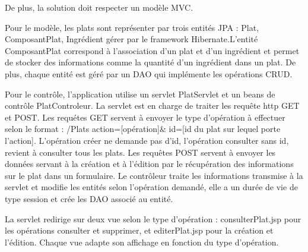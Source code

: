 De plus, la solution doit respecter un modèle MVC.

Pour le modèle, les plats sont représenter par trois entités JPA : Plat, ComposantPlat, Ingrédient gérer par le framework Hibernate.L'entité ComposantPlat correspond à l'association d'un plat et d'un ingrédient et permet de stocker des informations comme la quantité d'un ingrédient dans un plat. De plus, chaque entité est géré par un DAO qui implémente les opérations CRUD.

Pour le contrôle, l'application utilise un servlet PlatServlet et un beans de contrôle PlatControleur.
La servlet est en charge de traiter les requête http GET et POST. Les requétes GET servent à envoyer le type d'opération à effectuer selon le format : /Plats\? action=[opération]\& id=[id du plat sur lequel porte l'action]. L'opération créer ne demande pas d'id, l'opération consulter sans id, revient à consulter tous les plats.
Les requêtes POST servent à envoyer les données servant à la création et à l'édition par le récupération des informations sur le plat dans un formulaire.
Le contrôleur traite les informations transmise à la servlet et modifie les entités selon l'opération demandé, elle a un durée de vie de type session et crée les DAO associé au entité.

La servlet redirige sur deux vue selon le type d'opération : consulterPlat.jsp pour les opérations consulter et supprimer, et editerPlat.jsp pour la création et l'édition. Chaque vue adapte son affichage en fonction du type d'opération. 

